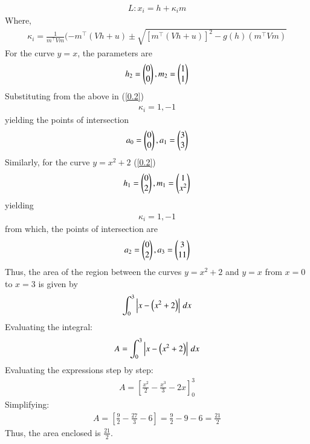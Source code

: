 \documentclass[journal]{IEEEtran}
\begin{document}
\begin{align}
    L : x_i=h+\kappa_i m 
\end{align}
Where,
\begin{align}
    \kappa_i=\frac{1}{m^\top Vm}(-m^\top(Vh+u) \pm \sqrt{[m^\top(Vh+u)]^2-g(h)(m^\top Vm)}
    \label{0.2}
\end{align}
For the curve $y = x$, the parameters are\\
\begin{align}    
    h_2=\begin{pmatrix}0\\0\end{pmatrix} , m_2=\begin{pmatrix}1\\1\end{pmatrix}
\end{align}
Substituting from the above in (\ref{0.2})\\
\begin{align}
    \kappa_i= 1,-1
\end{align}
yielding the points of intersection\\
\begin{align}
  a_0=\begin{pmatrix}0\\0\end{pmatrix}, a_1=\begin{pmatrix}3\\3\end{pmatrix}
\end{align}
Similarly, for the curve $y = x^2 + 2$ (\ref{0.2})\\
\begin{align}
   h_1=\begin{pmatrix}0\\2\end{pmatrix} , m_1=\begin{pmatrix}1\\x^2\end{pmatrix}
\end{align}
yielding\\
\begin{align}
    \kappa_i = 1, -1
\end{align}
from which, the points of intersection are\\
\begin{align}
      a_2=\begin{pmatrix}0\\2\end{pmatrix}, a_3=\begin{pmatrix}3\\11\end{pmatrix}
\end{align}
Thus, the area of the region between the curves  $y = x^2 + 2$ and $y = x$ from $x = 0$ to $x = 3$ is given by\\
\begin{align}
    \int_{0}^{3} \left| x - \left(x^2 + 2\right) \right| \, dx
\end{align}
Evaluating the integral:
\begin{align}
    A = \int_{0}^{3} \left| x - \left(x^2 + 2\right) \right| \, dx
\end{align}
Evaluating the expressions step by step:
\begin{align}
    A = \left[\frac{x^2}{2} - \frac{x^3}{3} - 2x\right]_{0}^{3}
\end{align}
Simplifying:
\begin{align}
    A = \left[\frac{9}{2} - \frac{27}{3} - 6\right] = \frac{9}{2} - 9 - 6 = \frac{21}{2}
\end{align}
Thus, the area enclosed is \(\frac{21}{2}\).
\end{document}
